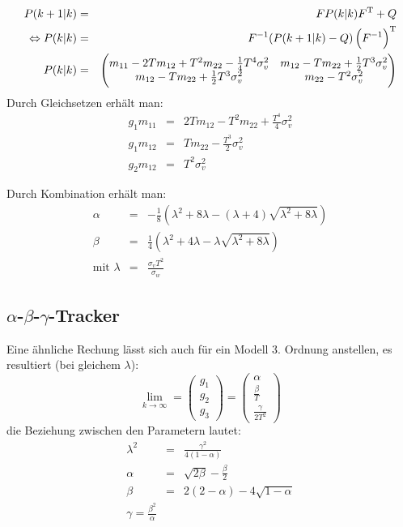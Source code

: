 \begin{eqnarray*}
    P(k+1|k) &=& F P(k|k) F^\text{T} + Q \\
    \Leftrightarrow P(k|k) &=& F^{-1} (P(k+1|k) - Q) \left(F^{-1}\right)^\text{T} \\
    P(k|k) &=&
        \begin{pmatrix}
            m_{11} - 2 T m_{12} + T^2 m_{22} - \frac{1}{4} T^4 \sigma_v^2 & m_{12} - T m_{22} + \frac{1}{2} T^3 \sigma_v^2 \\
            m_{12} - T m_{22} + \frac{1}{2} T^3 \sigma_v^2 & m_{22} - T^2 \sigma_v^2
        \end{pmatrix}
\end{eqnarray*}
Durch Gleichsetzen erhält man:
\begin{eqnarray*}
    g_1 m_{11} &=& 2 T m_{12} - T^2 m_{22} + \frac{T^4}{4} \sigma_v^2 \\
    g_1 m_{12} &=& T m_{22} - \frac{T^3}{2} \sigma_v^2 \\
    g_2 m_{12} &=& T^2 \sigma_v^2
\end{eqnarray*} 

Durch Kombination erhält man:
\begin{eqnarray*}
    \alpha &=& - \frac{1}{8} \left( \lambda^2 + 8 \lambda - (\lambda + 4) \sqrt{\lambda^2 + 8 \lambda} \right) \\
    \beta &=& \frac{1}{4} \left( \lambda^2 + 4\lambda - \lambda \sqrt{\lambda^2 + 8 \lambda} \right) \\
    \text{mit } \lambda &=& \frac{\sigma_v T^2}{\sigma_w} 
\end{eqnarray*}

\subsection{$\alpha$-$\beta$-$\gamma$-Tracker}
Eine ähnliche Rechung lässt sich auch für ein Modell 3. Ordnung anstellen, es resultiert (bei gleichem $\lambda$):
\begin{equation*}
    \lim_{k \to \infty} =
        \begin{pmatrix}
            g_1 \\ g_2 \\ g_3
        \end{pmatrix} =
        \begin{pmatrix}
            \alpha \\ \frac{\beta}{T} \\ \frac{\gamma}{2 T^2}
        \end{pmatrix}
\end{equation*}
die Beziehung zwischen den Parametern lautet:
\begin{eqnarray*}
    \lambda^2 &=& \frac{\gamma^2}{4 (1-\alpha)} \\
    \alpha &=& \sqrt{2 \beta} - \frac{\beta}{2} \\
    \beta &=& 2(2-\alpha) - 4 \sqrt{1-\alpha} \\
    \gamma = \frac{\beta^2}{\alpha}
\end{eqnarray*}
